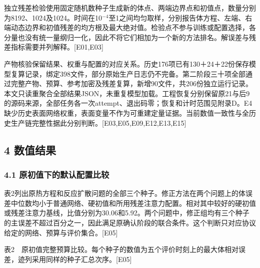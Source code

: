 \documentclass[11pt,a4paper]{article}
\begin{document}
独立残差检验使用固定随机数种子生成新的体点、两端边界点和初值点，数量分别为8192、1024及1024。时间在10\ensuremath{^{-4}}至1之间均匀取样，分别报告体方程、左端、右端动态边界和初值残差的均方根及最大绝对值。检验点不参与训练或配置选择，各分量也没有统一量纲归一化，因此不将它们相加为一个新的方法排名。解误差与残差指标需要并列解释。{[}E01,E03{]}

产物核验保留结果、权重与配置的对应关系。历史176项已有130＋24＋22份保存模型复算记录，绑定398文件，部分原始生产日志仍不完备。第二阶段三十项全部通过完整产物、预算、参考加密及残差复算，新增90文件，共206份独立运行记录。本文只读重聚合全部结果JSON，未重复模型加载。工程恢复分别保留原21与后9的源码来源，全部任务各一次attempt、退出码零；恢复和计时范围见附录D。E4缺少历史表面网络权重，表面变量不作为可重建定量证据。当前数值一致性与全历史生产链完整性据此分别判断。{[}E03,E05,E09,E12,E13,E15{]}

\subsection{4 数值结果}\label{ux6570ux503cux7ed3ux679c}

\subsubsection{4.1 原初值下的默认配置比较}\label{ux539fux521dux503cux4e0bux7684ux9ed8ux8ba4ux914dux7f6eux6bd4ux8f83}

表2列出原热方程和反应扩散问题的全部三个种子。修正方法在两个问题上的体误差中位数均小于普通网络、硬初值和所用残差注意力配置。相对其中较好的硬初值或残差注意力基线，比值分别为30.06和5.92。两个问题中，修正组均有三个种子的主误差不超过百分之一，因此满足原确认阶段的联合条件。这个判断只对应协议给定的网络、预算与评价集合。{[}E05{]}

表2　原初值完整预算比较。每个种子的数值为五个评价时刻上的最大体相对误差，迹列采用同样的种子汇总次序。{[}E05{]}
\end{document}
